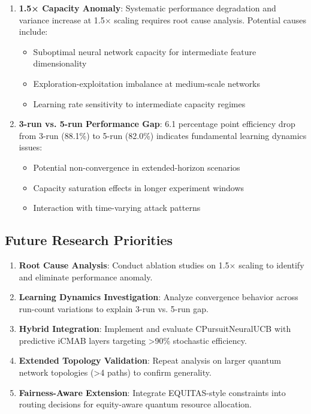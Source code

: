 \documentclass[12pt,a4paper]{article}
\newcommand{\critical}[1]{\textcolor{criticalcolor}{\textbf{#1}}}
\begin{document}
\begin{enumerate}
\item \critical{1.5× Capacity Anomaly}: Systematic performance degradation and variance increase at 1.5$\times$ scaling requires root cause analysis. Potential causes include:
\begin{itemize}
\item Suboptimal neural network capacity for intermediate feature dimensionality
\item Exploration-exploitation imbalance at medium-scale networks
\item Learning rate sensitivity to intermediate capacity regimes
\end{itemize}

\item \critical{3-run vs. 5-run Performance Gap}: 6.1 percentage point efficiency drop from 3-run (88.1\%) to 5-run (82.0\%) indicates fundamental learning dynamics issues:
\begin{itemize}
\item Potential non-convergence in extended-horizon scenarios
\item Capacity saturation effects in longer experiment windows
\item Interaction with time-varying attack patterns
\end{itemize}
\end{enumerate}

\subsection{Future Research Priorities}

\begin{enumerate}
\item \textbf{Root Cause Analysis}: Conduct ablation studies on 1.5$\times$ scaling to identify and eliminate performance anomaly.
\item \textbf{Learning Dynamics Investigation}: Analyze convergence behavior across run-count variations to explain 3-run vs. 5-run gap.
\item \textbf{Hybrid Integration}: Implement and evaluate CPursuitNeuralUCB with predictive iCMAB layers targeting >90\% stochastic efficiency.
\item \textbf{Extended Topology Validation}: Repeat analysis on larger quantum network topologies (>4 paths) to confirm generality.
\item \textbf{Fairness-Aware Extension}: Integrate EQUITAS-style constraints into routing decisions for equity-aware quantum resource allocation.
\end{enumerate}
\end{document}
